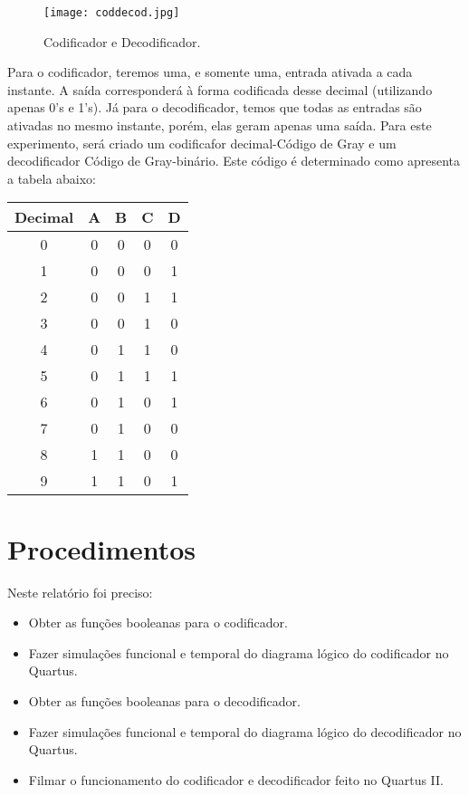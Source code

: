 \documentclass[12pt]{article}
\begin{document}
\begin{figure}[H]
	\centering
	\texttt{[image: coddecod.jpg]}
	\caption{Codificador e Decodificador.}
	\label{fig:coddecod}
\end{figure}


Para o codificador, teremos uma, e somente uma, entrada ativada a cada instante. A saída corresponderá à forma codificada desse decimal (utilizando apenas 0’s e 1’s). Já para o decodificador, temos que todas as entradas são ativadas no mesmo instante, porém, elas geram apenas uma saída. 
Para este experimento, será criado um codificafor decimal-Código de Gray e um decodificador Código de Gray-binário. Este código é determinado como apresenta a tabela abaixo:

\begin{table}[H]
	\centering
	\begin{tabular}{|c|c|c|c|c|}
		\cline{1-5}
		\multicolumn{1}{|c|}{Decimal} & \multicolumn{1}{|c|}{A} & \multicolumn{1}{|c|}{B} & \multicolumn{1}{|c|}{C} & \multicolumn{1}{|c|}{D}\\
		\hline
		0 & 0 & 0 & 0 & 0 \\
		\hline
		1 & 0 & 0 & 0 & 1 \\
		\hline
		2 & 0 & 0 & 1 & 1 \\
		\hline
		3 & 0 & 0 & 1 & 0 \\
		\hline
		4 & 0 & 1 & 1 & 0 \\
		\hline
		5 & 0 & 1 & 1 & 1 \\
		\hline
		6 & 0 & 1 & 0 & 1 \\
		\hline
		7 & 0 & 1 & 0 & 0 \\
		\hline
		8 & 1 & 1 & 0 & 0 \\
		\hline
		9 & 1 & 1 & 0 & 1 \\
		\hline
	\end{tabular}
	
\end{table} 




\section{Procedimentos}
\label{sec:Procedimentos}

Neste relatório foi preciso:
\begin{itemize}
	\item Obter as funções booleanas para o codificador.
	\item Fazer simulações funcional e temporal do diagrama lógico do codificador no Quartus. 
	\item Obter as funções booleanas para o decodificador.
	\item Fazer simulações funcional e temporal do diagrama lógico do decodificador no Quartus. 
	\item Filmar o funcionamento do codificador e decodificador feito no Quartus II.
\end{itemize}
\end{document}
